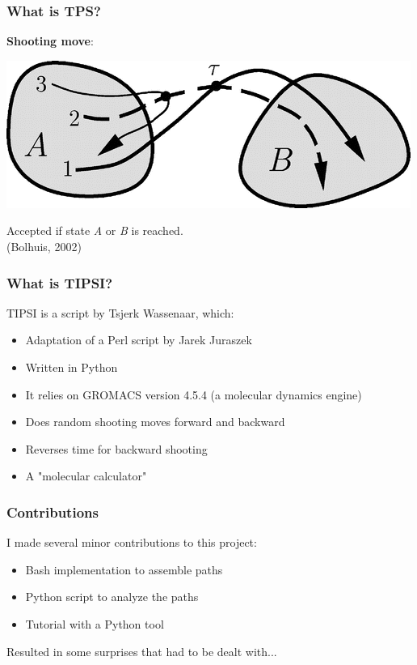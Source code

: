 \documentclass[hyperref={pdfpagelabels=false}]{beamer}
\begin{document}
\begin{frame}
\frametitle{What is TPS?}
\textbf{Shooting move}:
\begin{center}
\includegraphics[scale=0.5]{images/bolhuis2.png}
\end{center}
Accepted if state \textit{A} or \textit{B} is reached.\\
(Bolhuis, 2002)
\end{frame}

\begin{frame}
\frametitle{What is \textsc{TIPSI}?} 
\textsc{TIPSI} is a script by Tsjerk Wassenaar, which:
\begin{itemize}
\item Adaptation of a Perl script by Jarek Juraszek
\item Written in Python
\item It relies on \textsc{GROMACS} version 4.5.4 (a molecular dynamics engine)
\item Does random shooting moves forward and backward
\item Reverses time for backward shooting
\item A "molecular calculator"
\end{itemize}
\end{frame}


\begin{frame}
\frametitle{Contributions}
I made several minor contributions to this project:
\begin{itemize}
\item Bash implementation to assemble paths
\item Python script to analyze the paths
\item Tutorial with a Python tool
\end{itemize}
Resulted in some surprises that had to be dealt with...
\end{frame}
\end{document}
